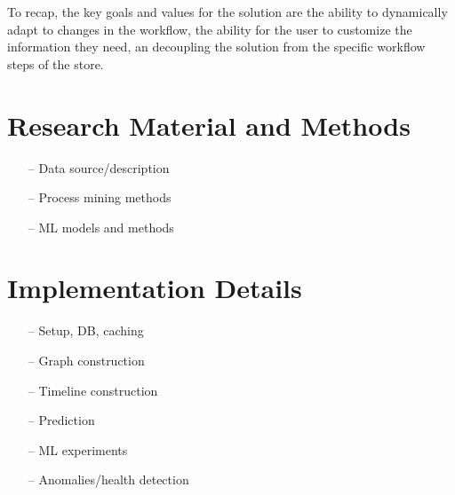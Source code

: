 \documentclass[english,12pt,a4paper,pdftex,sci,utf8]{aaltothesis}
\begin{document}
To recap, the key goals and values for the solution are the ability to dynamically adapt to changes in the workflow,
the ability for the user to customize the information they need, an decoupling the solution from the specific 
workflow steps of the store.


\clearpage
\section{Research Material and Methods}
\label{sec:methods}








\begin{itemize}
\item[--]Data source/description
\item[--]Process mining methods
\item[--]ML models and methods
\end{itemize}


\clearpage
\section{Implementation Details}

\begin{itemize}
\item[--]Setup, DB, caching
\item[--]Graph construction
\item[--]Timeline construction
\item[--]Prediction
\item[--]ML experiments
\item[--]Anomalies/health detection
\end{itemize}
\end{document}
